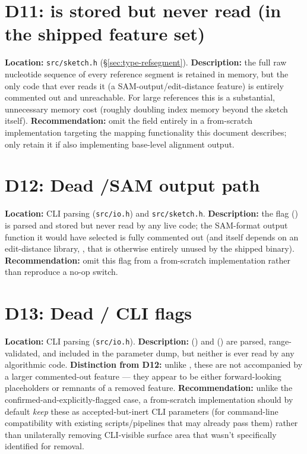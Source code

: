 \section{D11:  is stored but never read (in the shipped feature set)}
\label{sec:d11}
\textbf{Location:} \texttt{src/sketch.h} (\S\ref{sec:type-refsegment}). \textbf{Description:} the
full raw nucleotide sequence of every reference segment is retained in memory, but the only code
that ever reads it (a SAM-output/edit-distance feature) is entirely commented out and
unreachable. For large references this is a substantial, unnecessary memory cost (roughly doubling
index memory beyond the sketch itself). \textbf{Recommendation:} omit the field entirely in a
from-scratch implementation targeting the mapping functionality this document describes; only
retain it if also implementing base-level alignment output.

\section{D12: Dead /SAM output path}
\label{sec:d12}
\textbf{Location:} CLI parsing (\texttt{src/io.h}) and \texttt{src/sketch.h}.
\textbf{Description:} the  flag () is parsed and stored but never read by any
live code; the SAM-format output function it would have selected is fully commented out (and
itself depends on an edit-distance library, , that is otherwise entirely unused by the
shipped binary). \textbf{Recommendation:} omit this flag from a from-scratch implementation rather
than reproduce a no-op switch.

\section{D13: Dead / CLI flags}
\label{sec:d13}
\textbf{Location:} CLI parsing (\texttt{src/io.h}). \textbf{Description:} 
() and  () are parsed, range-validated, and included in the
parameter dump, but neither is ever read by any algorithmic code. \textbf{Distinction from D12:}
unlike , these are not accompanied by a larger commented-out feature --- they appear to be
either forward-looking placeholders or remnants of a removed feature. \textbf{Recommendation:}
unlike the confirmed-and-explicitly-flagged  case, a from-scratch implementation should
by default \emph{keep} these as accepted-but-inert CLI parameters (for command-line compatibility
with existing scripts/pipelines that may already pass them) rather than unilaterally removing
CLI-visible surface area that wasn't specifically identified for removal.

